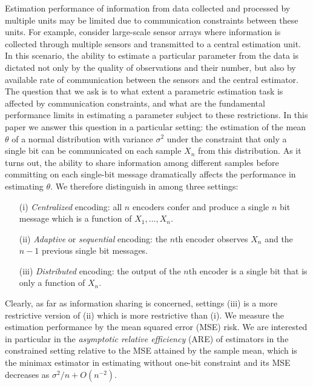 \documentclass[letterpaper, conference,9pt]{IEEEtran}      %
\begin{document}
Estimation performance of information from data collected and processed by multiple units may be limited due to communication constraints between these units. 
For example, consider large-scale sensor arrays where information is collected through multiple sensors and transmitted to a central estimation unit. In this scenario, the ability to estimate a particular parameter from the data is dictated not only by the quality of observations and their number, but also by available rate of communication between the sensors and the central estimator. The question that we ask is to what extent a parametric estimation task is affected by communication constraints, and what are the fundamental performance limits in estimating a parameter subject to these restrictions. In this paper we answer this question in a particular setting: the estimation of the mean $\theta$ of a normal distribution with variance $\sigma^2$ under the constraint that only a single bit can be communicated on each sample $X_n$ from this distribution. As it turns out, the ability to share information among different samples before committing on each single-bit message dramatically affects the performance in estimating $\theta$. We therefore distinguish in among three settings:
 \begin{itemize}
 \item[(i)] \emph{Centralized} encoding: all $n$ encoders confer and produce a single $n$ bit message which is a function of $X_1,\ldots,X_n$. 
 \item[(ii)] \emph{Adaptive} or \emph{sequential} encoding: the $n$th encoder observes $X_n$ and the $n-1$ previous single bit messages.
 \item[(iii)] \emph{Distributed} encoding: the output of the $n$th encoder is a single bit that is only a function of $X_n$.
 \end{itemize}
Clearly, as far as information sharing is concerned, settings (iii) is a more restrictive version of (ii) which is more restrictive than (i). We measure the estimation performance by the mean squared error (MSE) risk. We are interested in particular in the \emph{asymptotic relative efficiency} (ARE) of estimators in the constrained setting relative to the MSE attained by the sample mean, which is the minimax estimator in estimating without one-bit constraint and its MSE decreases as $\sigma^2/n+O(n^{-2})$. \\
\end{document}
